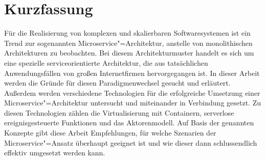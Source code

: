 \chapter{Kurzfassung}

Für die Realisierung von komplexen und skalierbaren Softwaresystemen ist ein Trend zur sogenannten Microservice"=Architektur, anstelle von monolithischen Architekturen zu beobachten. Bei diesem Architekturmuster handelt es sich um eine spezielle serviceorientierte Architektur, die aus tatsächlichen Anwendungsfällen von großen Internetfirmen hervorgegangen ist. In dieser Arbeit werden die Gründe für diesen Paradigmenwechsel gesucht und erläutert. Außerdem werden verschiedene Technologien für die erfolgreiche Umsetzung einer Microservice"=Architektur untersucht und miteinander in Verbindung gesetzt. Zu diesen Technologien zählen die Virtualisierung mit Containern, serverlose ereignisgesteuerte Funktionen und das Aktorenmodell. Auf Basis der genannten Konzepte gibt diese Arbeit Empfehlungen, für welche Szenarien der Microservice"=Ansatz überhaupt geeignet ist und wie dieser dann schlussendlich effektiv umgesetzt werden kann.